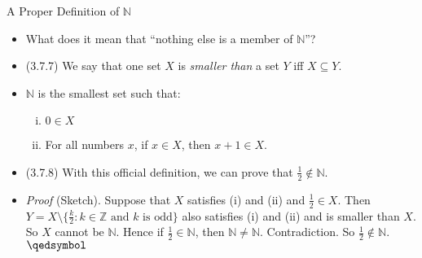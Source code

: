\documentclass[../slides.tex]{subfiles}
\begin{document}
\begin{frame}{A Proper Definition of $\mathbb{N}$}

	\begin{itemize}

		\item What does it mean that ``nothing else is a member of $\mathbb{N}$''?
		
		\item (3.7.7) We say that one set $X$ is \emph{smaller than} a set $Y$ iff $X\subseteq Y$.
		
		\item $\mathbb{N}$ is the smallest set such that:
		
		\begin{enumerate}[(i)]
	
		\item $0\in X$
		
		\item For all numbers $x$, if $x\in X$, then $x+1\in X$.
	
	\end{enumerate}
	
		\item (3.7.8) With this official definition, we can prove that $\frac{1}{2}\notin \mathbb{N}$.
		
		\item \emph{Proof} (Sketch). Suppose that $X$ satisfies (i) and (ii) and $\frac{1}{2}\in X$. Then $Y=X\setminus \{\frac{k}{2}: k\in \mathbb{Z}\text{ and }k\text{ is odd}\}$ also satisfies (i) and (ii) and is smaller than $X$. So $X$ cannot be $\mathbb{N}$. Hence if $\frac{1}{2}\in\mathbb{N}$, then $\mathbb{N}\neq\mathbb{N}$. Contradiction. So $\frac{1}{2}\notin\mathbb{N}$. $\qedsymbol$
	
	\end{itemize}

\end{frame}
\end{document}
